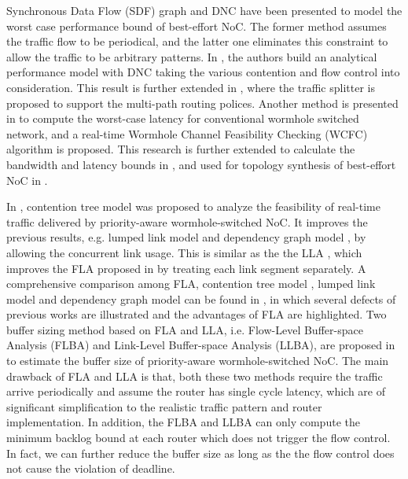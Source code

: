 \documentclass[10pt,journal]{IEEEtran}
\begin{document}
Synchronous Data Flow (SDF) graph \cite{poplavko2003task} and DNC \cite{qian2009analysis} have been presented to model the worst case performance bound of best-effort NoC. The former method assumes the traffic flow to be periodical, and the latter one eliminates this constraint to allow the traffic to be arbitrary patterns. In \cite{qian2009analysis}, the authors build an analytical performance model with DNC taking the various contention and flow control into consideration. This result is further extended in \cite{Du:2012:WPA:2380445.2380469}, where the traffic splitter is proposed to support the multi-path routing polices. Another method is presented in \cite{Lee:2003:RWC:846077.846083} to compute the worst-case latency for conventional wormhole switched network, and a real-time Wormhole Channel Feasibility Checking (WCFC) algorithm is proposed. This research is further extended to calculate the bandwidth and latency bounds in \cite{6109240}, and used for topology synthesis of best-effort NoC in \cite{EPFL-ARTICLE-186879}.

In \cite{LuJS05}, contention tree model was proposed to analyze the feasibility of real-time traffic delivered by priority-aware wormhole-switched NoC. It improves the previous results, e.g. lumped link model \cite{707545} and dependency graph model \cite{708526}, by allowing the concurrent link usage. This is similar as the the LLA \cite{73}, which improves the FLA proposed in \cite{Shi:2008:RCA:1397757.1397996} by treating each link segment separately. A comprehensive comparison among FLA, contention tree model \cite{LuJS05}, lumped link model \cite{707545} and dependency graph model \cite{708526} can be found in \cite{Shi2009}, in which several defects of previous works \cite{LuJS05}\cite{707545}\cite{708526} are illustrated and the advantages of FLA are highlighted. Two buffer sizing method based on FLA and LLA, i.e. Flow-Level Buffer-space Analysis (FLBA) and Link-Level Buffer-space Analysis (LLBA), are proposed in \cite{189} to estimate the buffer size of priority-aware wormhole-switched NoC. The main drawback of FLA and LLA is that, both these two methods require the traffic arrive periodically and assume the router has single cycle latency, which are of significant simplification to the realistic traffic pattern and router implementation. In addition, the FLBA and LLBA can only compute the minimum backlog bound at each router which does not trigger the flow control. In fact, we can further reduce the buffer size as long as the the flow control does not cause the violation of deadline.
\end{document}
